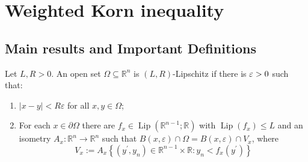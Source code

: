 \chapter{Weighted Korn inequality}

\section{Main results and Important Definitions}
\begin{definition} \label{UniformLip} Let $L, R>0$. An open set $\Omega \subseteq \mathbb{R}^n$ is $(L, R)$-Lipschitz if there is $\varepsilon>0$ such that:
\begin{enumerate}
    \item $|x-y|<R\varepsilon$ for all $x, y \in \Omega$;
    \item For each $x \in \partial \Omega$ there are $f_x \in \operatorname{Lip}\left(\mathbb{R}^{n-1} ; \mathbb{R}\right)$ with $\operatorname{Lip}\left(f_x\right) \leq L$ and an isometry $A_x: \mathbb{R}^n \rightarrow \mathbb{R}^n$ such that $B(x,\varepsilon) \cap \Omega=B(x,\varepsilon) \cap V_x$, where
        $$
            V_x:=A_x\left\{\left(y^{\prime}, y_n\right) \in \mathbb{R}^{n-1} \times \mathbb{R}: y_n<f_x\left(y^{\prime}\right)\right\}
        $$
\end{enumerate}
\end{definition}
